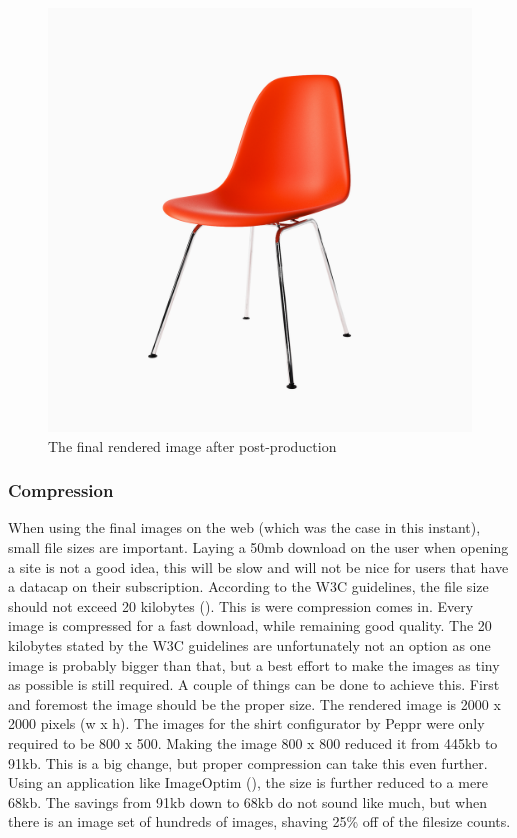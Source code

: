 \begin{figure}
\centering
\includegraphics[width=15cm]{images/post}
\caption{The final rendered image after post-production}
\label{figure:post_production}
\end{figure}
\subsubsection{Compression}
When using the final images on the web (which was the case in this instant), small file sizes are important. Laying a 50mb download on the user when opening a site is not a good idea, this will be slow and will not be nice for users that have a datacap on their subscription. According to the W3C guidelines, the file size should not exceed 20 kilobytes (\cite{pageFileSizeLimit}). This is were compression comes in. Every image is compressed for a fast download, while remaining good quality. The 20 kilobytes stated by the W3C guidelines are unfortunately not an option as one image is probably bigger than that, but a best effort to make the images as tiny as possible is still required.
A couple of things can be done to achieve this. First and foremost the image should be the proper size. The rendered image is 2000 x 2000 pixels (w x h). The images for the shirt configurator by Peppr were only required to be 800 x 500. Making the image 800 x 800 reduced it from 445kb to 91kb. This is a big change, but  proper compression can take this even further. Using an application like ImageOptim (\cite{imageOptim}), the size is further reduced to a mere 68kb. The savings from 91kb down to 68kb do not sound like much, but when there is an image set of hundreds of images, shaving 25\% off of the filesize counts.

